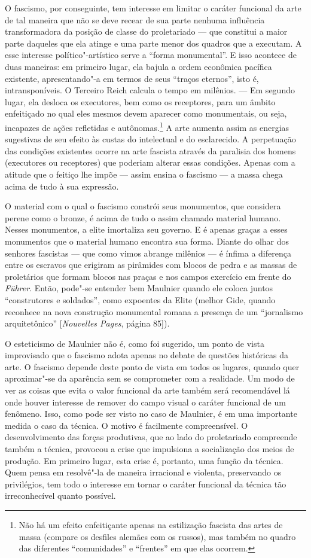 O fascismo, por conseguinte, tem interesse ​​em limitar o caráter
funcional da arte de tal maneira que não se deve recear de sua parte
nenhuma influência transformadora da posição de classe do proletariado
--- que constitui a maior parte daqueles que ela atinge e uma parte menor
dos quadros que a executam. A esse interesse político"-artístico serve a
``forma monumental''. E isso acontece de duas maneiras: em primeiro
lugar, ela bajula a ordem econômica pacífica existente, apresentando"-a
em termos de seus ``traços eternos'', isto é, intransponíveis. O
Terceiro Reich calcula o tempo em milênios. --- Em segundo lugar, ela
desloca os executores, bem como os receptores, para um âmbito
enfeitiçado no qual eles mesmos devem aparecer como monumentais, ou
seja, incapazes de ações refletidas e autônomas.\footnote{Não há
  um efeito enfeitiçante apenas na estilização fascista das artes de
  massa (compare os desfiles alemães com os russos), mas também no
  quadro das diferentes ``comunidades'' e ``frentes'' em que elas
  ocorrem. \versal{[N. A.]}} A arte aumenta assim as energias sugestivas de seu efeito às
custas do intelectual e do esclarecido. A perpetuação das condições
existentes ocorre na arte fascista através da paralisia dos homens
(executores ou receptores) que poderiam alterar essas condições. Apenas
com a atitude que o feitiço lhe impõe --- assim ensina o fascismo --- a
massa chega acima de tudo à sua expressão.

O material com o qual o fascismo constrói seus monumentos, que considera
perene como o bronze, é acima de tudo o assim chamado material humano.
Nesses monumentos, a elite imortaliza seu governo. E é apenas graças a
esses monumentos que o material humano encontra sua forma. Diante do
olhar dos senhores fascistas --- que como vimos abrange milênios --- é
ínfima a diferença entre os escravos que erigiram as pirâmides com
blocos de pedra e as massas de proletários que formam blocos nas praças
e nos campos exercício em frente do \emph{Führer}. Então, pode"-se
entender bem Maulnier quando ele coloca juntos ``construtores e
soldados'', como expoentes da Elite (melhor Gide, quando reconhece na
nova construção monumental romana a presença de um ``jornalismo
arquitetônico'' {[}\emph{Nouvelles Pages}, página 85{]}).

O esteticismo de Maulnier não é, como foi sugerido, um ponto de vista
improvisado que o fascismo adota apenas no debate de questões históricas
da arte. O fascismo depende deste ponto de vista em todos os lugares,
quando quer aproximar"-se da aparência sem se comprometer com a
realidade. Um modo de ver as coisas que evita o valor funcional da arte
também será recomendável lá onde houver interesse de remover do campo
visual o caráter funcional de um fenômeno. Isso, como pode ser visto no
caso de Maulnier, é em uma importante medida o caso da técnica. O motivo
é facilmente compreensível. O desenvolvimento das forças produtivas, que
ao lado do proletariado compreende também a técnica, provocou a crise
que impulsiona a socialização dos meios de produção. Em primeiro lugar,
esta crise é, portanto, uma função da técnica. Quem pensa em resolvê"-la
de maneira irracional e violenta, preservando os privilégios, tem todo o
interesse em tornar o caráter funcional da técnica tão irreconhecível
quanto possível.


